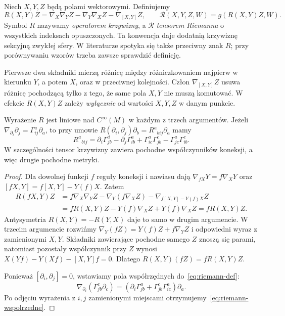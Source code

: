 \begin{definicja}\label{def:tensor-krzywizny}
Niech $X,Y,Z$ będą polami wektorowymi. Definiujemy
\begin{equation}\label{eq:riemann-def}
 R(X,Y)Z=\nabla_X\nabla_YZ-\nabla_Y\nabla_XZ
                        -\nabla_{[X,Y]}Z,
 \qquad
 \mathcal R(X,Y,Z,W)=g(R(X,Y)Z,W).
\end{equation}
Symbol $R$ nazywamy \emph{operatorem krzywizny}, a
$\mathcal R$ \emph{tensorem Riemanna} o wszystkich
indeksach opuszczonych. Ta konwencja daje dodatnią
krzywiznę sekcyjną zwykłej sfery. W literaturze spotyka
się także przeciwny znak $R$; przy porównywaniu wzorów
trzeba zawsze sprawdzić definicję.
\end{definicja}

Pierwsze dwa składniki mierzą różnicę między różniczkowaniem
najpierw w kierunku $Y$, a potem $X$, oraz w przeciwnej
kolejności. Człon $\nabla_{[X,Y]}Z$ usuwa różnicę pochodzącą
tylko z tego, że same pola $X,Y$ nie muszą komutować.
W efekcie $R(X,Y)Z$ zależy \emph{wyłącznie} od wartości
$X,Y,Z$ w danym punkcie.

\begin{stwierdzenie}
\label{prop:riemann-tensorowy}
Wyrażenie $R$ jest liniowe nad $C^\infty(M)$ w każdym
z trzech argumentów. Jeżeli
$\nabla_{\partial_i}\partial_j=\Gamma^a_{ij}\partial_a$,
to przy umowie
$R(\partial_i,\partial_j)\partial_b
 =R^a{}_{b i j}\partial_a$ mamy
\begin{equation}\label{eq:riemann-wspolrzedne}
 R^a{}_{b i j}
 =\partial_i\Gamma^a_{j b}-\partial_j\Gamma^a_{i b}
  +\Gamma^a_{i c}\Gamma^c_{j b}
  -\Gamma^a_{j c}\Gamma^c_{i b}.
\end{equation}
W szczególności tensor krzywizny zawiera pochodne
współczynników koneksji, a więc drugie pochodne metryki.
\end{stwierdzenie}

\begin{proof}
Dla dowolnej funkcji $f$ reguły koneksji i nawiasu dają
$\nabla_{fX}Y=f\nabla_XY$ oraz
$[fX,Y]=f[X,Y]-Y(f)X$. Zatem
\[
 \begin{split}
 R(fX,Y)Z
 &=f\nabla_X\nabla_YZ-\nabla_Y(f\nabla_XZ)
        -\nabla_{f[X,Y]-Y(f)X}Z\\
 &=fR(X,Y)Z-Y(f)\nabla_XZ+Y(f)\nabla_XZ
  =fR(X,Y)Z.
 \end{split}
\]
Antysymetria $R(X,Y)=-R(Y,X)$ daje to samo w drugim
argumencie. W trzecim argumencie rozwińmy
$\nabla_Y(fZ)=Y(f)Z+f\nabla_YZ$ i odpowiedni wyraz
z zamienionymi $X,Y$. Składniki zawierające pochodne
samego $Z$ znoszą się parami, natomiast pozostały
współczynnik przy $Z$ wynosi
$X(Yf)-Y(Xf)-[X,Y]f=0$. Dlatego $R(X,Y)(fZ)=fR(X,Y)Z$.

Ponieważ $[\partial_i,\partial_j]=0$, wstawiamy pola
współrzędnych do~\eqref{eq:riemann-def}:
\[
 \nabla_{\partial_i}(\Gamma^c_{jb}\partial_c)
 =(\partial_i\Gamma^a_{jb}
       +\Gamma^c_{jb}\Gamma^a_{ic})\partial_a.
\]
Po odjęciu wyrażenia z $i,j$ zamienionymi miejscami
otrzymujemy~\eqref{eq:riemann-wspolrzedne}.
\end{proof}

